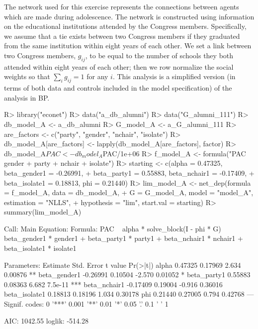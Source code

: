 \documentclass[nojss]{jss}
\begin{document}
The network used for this exercise represents the connections between agents which are made during adolescence. The network is constructed using information on the educational institutions attended by the Congress members. Specifically, we assume that a tie exists between two Congress members if they graduated from the same institution within eight years of each other. We set a link between two Congress members, $g_{ij}$, to be equal to the number of schools they both attended within eight years of each other; then we row normalize the social weights so that $\sum_{i}g_{ij}=1$ for any $i$. This analysis is a simplified version (in terms of both data and controls included in the model specification) of the analysis in BP.
\begin{CodeChunk}
\begin{CodeInput}
R> library("econet")
R> data("a_db_alumni")
R> data("G_alumni_111")
R> db_model_A <- a_db_alumni
R> G_model_A <- a_G_alumni_111
R> are_factors <- c("party", "gender", "nchair", "isolate")
R> db_model_A[are_factors] <- lapply(db_model_A[are_factors], factor)
R> db_model_A$PAC <- db_model_A$PAC/1e+06
R> f_model_A <- formula("PAC ~ gender + party + nchair + isolate")
R> starting <- c(alpha = 0.47325, beta_gender1 = -0.26991,
+    beta_party1 = 0.55883, beta_nchair1 = -0.17409,
+    beta_isolate1 = 0.18813, phi = 0.21440)
R> lim_model_A <- net_dep(formula = f_model_A, data = db_model_A,
+    G = G_model_A, model = "model_A", estimation = "NLLS",
+    hypothesis = "lim", start.val = starting)
R> summary(lim_model_A)
\end{CodeInput}
\begin{CodeOutput}
Call:
Main Equation:  
Formula: PAC ~ alpha * solve_block(I - phi * G) %
beta_gender1 * gender1 + beta_party1 * party1 + 
beta_nchair1 * nchair1 + beta_isolate1 * isolate1

Parameters:
			Estimate Std. Error t value Pr(>|t|)    
alpha          0.47325    0.17969   2.634  0.00876 ** 
beta_gender1  -0.26991    0.10504  -2.570  0.01052 *  
beta_party1    0.55883    0.08363   6.682  7.5e-11 ***
beta_nchair1  -0.17409    0.19004  -0.916  0.36016    
beta_isolate1  0.18813    0.18196   1.034  0.30178    
phi            0.21440    0.27005   0.794  0.42768    
---
Signif. codes:  0 '***' 0.001 '**' 0.01 '*' 0.05 '.' 0.1 ' ' 1

AIC: 1042.55  loglik: -514.28
\end{CodeOutput}
\end{CodeChunk}
\end{document}
